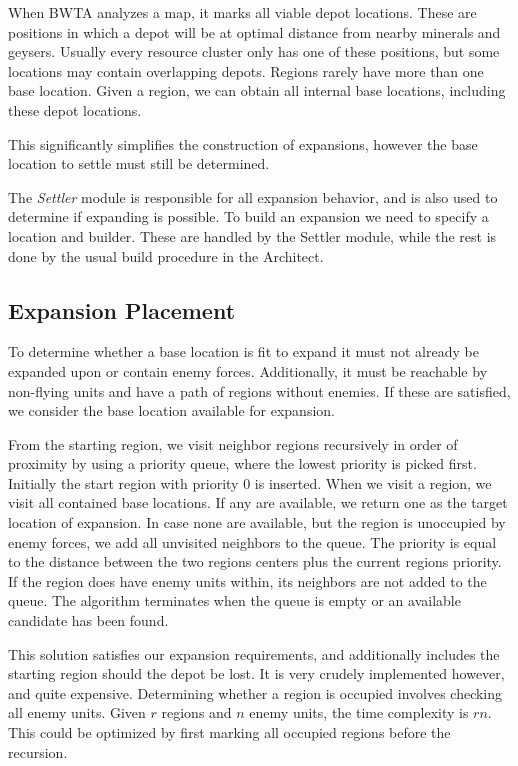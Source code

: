 When BWTA analyzes a map, it marks all viable depot locations. These are positions in which a depot will be at optimal distance from nearby minerals and geysers. Usually every resource cluster only has one of these positions, but some locations may contain overlapping depots. Regions rarely have more than one base location. Given a region, we can obtain all internal base locations, including these depot locations.

This significantly simplifies the construction of expansions, however the base location to settle must still be determined.

The \emph{Settler} module is responsible for all expansion behavior, and is also used to determine if expanding is possible. To build an expansion we need to specify a location and builder. These are handled by the Settler module, while the rest is done by the usual build procedure in the Architect.

	\subsection*{Expansion Placement}
	To determine whether a base location is fit to expand it must not already be expanded upon or contain enemy forces. Additionally, it must be reachable by non-flying units and have a path of regions without enemies. If these are satisfied, we consider the base location available for expansion.
	
	From the starting region, we visit neighbor regions recursively in order of proximity by using a priority queue, where the lowest priority is picked first. Initially the start region with priority 0 is inserted. When we visit a region, we visit all contained base locations. If any are available, we return one as the target location of expansion. In case none are available, but the region is unoccupied by enemy forces, we add all unvisited neighbors to the queue. The priority is equal to the distance between the two regions centers plus the current regions priority. If the region does have enemy units within, its neighbors are not added to the queue. The algorithm terminates when the queue is empty or an available candidate has been found.

	This solution satisfies our expansion requirements, and additionally includes the starting region should the depot be lost. It is very crudely implemented however, and quite expensive. Determining whether a region is occupied involves checking all enemy units. Given $r$ regions and $n$ enemy units, the time complexity is $rn$. This could be optimized by first marking all occupied regions before the recursion.
	
